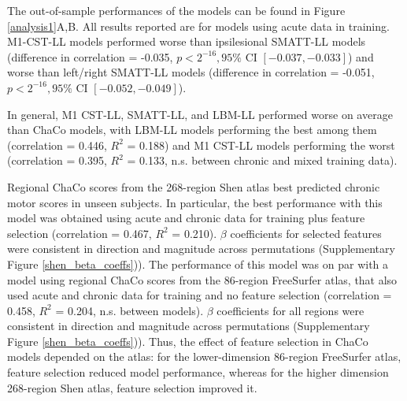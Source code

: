 \documentclass[10pt]{article}
\begin{document}
The out-of-sample performances of the models can be found in Figure \ref{analysis1}A,B. All results reported are for models using acute data in training. M1-CST-LL models performed worse than ipsilesional SMATT-LL models (difference in correlation = -0.035, $p < 2^{-16}, 95\%$ CI $[-0.037, -0.033]$) and worse than left/right SMATT-LL models (difference in correlation = -0.051, $p < 2^{-16}, 95\%$ CI $[-0.052, -0.049]$). 



In general, M1 CST-LL, SMATT-LL, and LBM-LL performed worse on average than ChaCo models, with LBM-LL models performing the best among them (correlation = 0.446, $R^2$ = 0.188) and M1 CST-LL models performing the worst (correlation = 0.395, $R^2$ = 0.133, n.s. between chronic and mixed training data). 


Regional ChaCo scores from the 268-region Shen atlas best predicted chronic motor scores in unseen subjects. In particular, the best performance with this model was obtained using acute and chronic data for training plus feature selection (correlation = 0.467, $R^2$ = 0.210). $\beta$ coefficients for selected features were consistent in direction and magnitude across permutations (Supplementary Figure \ref{shen_beta_coeffs})). The performance of this model was on par with a model using regional ChaCo scores from the 86-region FreeSurfer atlas, that also used acute and chronic data for training and no feature selection (correlation = 0.458, $R^2$ = 0.204, n.s. between models). $\beta$ coefficients for all regions were consistent in direction and magnitude across permutations (Supplementary Figure  \ref{shen_beta_coeffs})).  Thus, the effect of feature selection in ChaCo models depended on the atlas: for the lower-dimension 86-region FreeSurfer atlas, feature selection reduced model performance, whereas for the higher dimension 268-region Shen atlas, feature selection improved it. 
\end{document}
